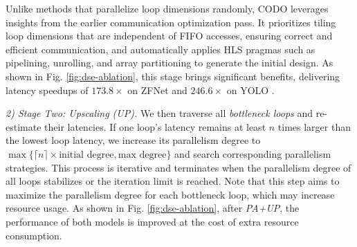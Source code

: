 \documentclass[conference]{IEEEtran}
\begin{document}
Unlike methods that parallelize loop dimensions randomly, CODO leverages insights from the earlier communication optimization pass. It prioritizes tiling loop dimensions that are independent of FIFO accesses, ensuring correct and efficient communication, and automatically applies HLS pragmas such as pipelining, unrolling, and array partitioning to generate the initial design.
As shown in Fig. \ref{fig:dse-ablation}, this stage brings significant benefits,
delivering latency speedups of $173.8 \times$ on ZFNet \cite{zeiler2014visualizing} and $246.6 \times$ on YOLO \cite{YOLO}.



\textit{2) Stage Two: Upscaling (\textit{UP}).} We then traverse all \textit{bottleneck loops} and re-estimate their latencies. If one loop's latency remains at least \( n \) times larger than the lowest loop latency, we increase its parallelism degree to
$\max\{\lceil n \rceil \times \text{initial degree}, \text{max degree}\}$ and search corresponding parallelism strategies.
This process is iterative and terminates when the parallelism degree of all loops stabilizes or the iteration limit is reached. Note that this step aims to maximize the parallelism degree for each bottleneck loop, which may increase resource usage. As shown in Fig. \ref{fig:dse-ablation}, after \textit{PA+UP}, the performance of both models is improved at the cost of extra resource consumption.
\end{document}
